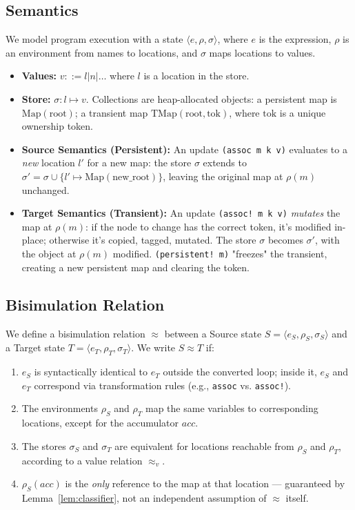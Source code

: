 \documentclass[sigplan,review,anonymous]{acmart}
\begin{document}
\subsection{Semantics}

We model program execution with a state $\langle e, \rho, \sigma \rangle$, where $e$ is the expression, $\rho$ is an environment from names to locations, and $\sigma$ maps locations to values.

\begin{itemize}
    \item \textbf{Values:} $v ::= l | n | \dots$ where $l$ is a location in the store.
    \item \textbf{Store:} $\sigma: l \mapsto v$. Collections are heap-allocated objects: a persistent map is $\text{Map}(\text{root})$; a transient map $\text{TMap}(\text{root}, \text{tok})$, where $\text{tok}$ is a unique ownership token.
    \item \textbf{Source Semantics (Persistent):} An update \texttt{(assoc m k v)} evaluates to a \emph{new} location $l'$ for a new map: the store $\sigma$ extends to $\sigma' = \sigma \cup \{l' \mapsto \text{Map}(\text{new\_root})\}$, leaving the original map at $\rho(m)$ unchanged.
    \item \textbf{Target Semantics (Transient):} An update \texttt{(assoc! m k v)} \emph{mutates} the map at $\rho(m)$: if the node to change has the correct token, it's modified in-place; otherwise it's copied, tagged, mutated. The store $\sigma$ becomes $\sigma'$, with the object at $\rho(m)$ modified. \texttt{(persistent! m)} "freezes" the transient, creating a new persistent map and clearing the token.
\end{itemize}

\subsection{Bisimulation Relation}

We define a bisimulation relation $\approx$ between a Source state $S = \langle e_S, \rho_S, \sigma_S \rangle$ and a Target state $T = \langle e_T, \rho_T, \sigma_T \rangle$. We write $S \approx T$ if:

\begin{enumerate}
    \item $e_S$ is syntactically identical to $e_T$ outside the converted loop; inside it, $e_S$ and $e_T$ correspond via transformation rules (e.g., \texttt{assoc} vs. \texttt{assoc!}).
    \item The environments $\rho_S$ and $\rho_T$ map the same variables to corresponding locations, except for the accumulator $acc$.
    \item The stores $\sigma_S$ and $\sigma_T$ are equivalent for locations reachable from $\rho_S$ and $\rho_T$, according to a value relation $\approx_v$.
    \item $\rho_S(acc)$ is the \emph{only} reference to the map at that location --- guaranteed by Lemma~\ref{lem:classifier}, not an independent assumption of $\approx$ itself.
\end{enumerate}
\end{document}
